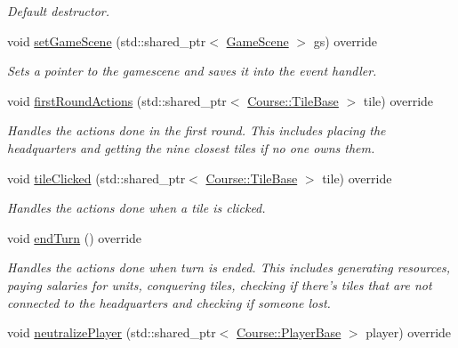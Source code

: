 \begin{DoxyCompactItemize}
\begin{DoxyCompactList}\small\item\em Default destructor. \end{DoxyCompactList}\item 
void \hyperlink{class_student_1_1_game_event_handler_abae6c2f38ace8632bae46ec18b07247d}{set\-Game\-Scene} (std\-::shared\-\_\-ptr$<$ \hyperlink{class_student_1_1_game_scene}{Game\-Scene} $>$ gs) override
\begin{DoxyCompactList}\small\item\em Sets a pointer to the gamescene and saves it into the event handler. \end{DoxyCompactList}\item 
void \hyperlink{class_student_1_1_game_event_handler_a0c407a2cb6f982ce5e6c7e5d3075cef1}{first\-Round\-Actions} (std\-::shared\-\_\-ptr$<$ \hyperlink{class_course_1_1_tile_base}{Course\-::\-Tile\-Base} $>$ tile) override
\begin{DoxyCompactList}\small\item\em Handles the actions done in the first round. This includes placing the headquarters and getting the nine closest tiles if no one owns them. \end{DoxyCompactList}\item 
void \hyperlink{class_student_1_1_game_event_handler_a321b8e2db1e041549bfb22e9d98f38b2}{tile\-Clicked} (std\-::shared\-\_\-ptr$<$ \hyperlink{class_course_1_1_tile_base}{Course\-::\-Tile\-Base} $>$ tile) override
\begin{DoxyCompactList}\small\item\em Handles the actions done when a tile is clicked. \end{DoxyCompactList}\item 
void \hyperlink{class_student_1_1_game_event_handler_a6ab8b7ecd8871e84e6e619a7d2249497}{end\-Turn} () override
\begin{DoxyCompactList}\small\item\em Handles the actions done when turn is ended. This includes generating resources, paying salaries for units, conquering tiles, checking if there's tiles that are not connected to the headquarters and checking if someone lost. \end{DoxyCompactList}\item 
void \hyperlink{class_student_1_1_game_event_handler_a77551fd417e10239804f8900bbd6d055}{neutralize\-Player} (std\-::shared\-\_\-ptr$<$ \hyperlink{class_course_1_1_player_base}{Course\-::\-Player\-Base} $>$ player) override

\end{DoxyCompactItemize}
